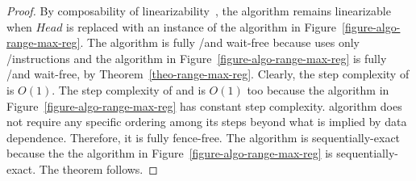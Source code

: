 \begin{proof}
By composability of linearizability~\cite{DBLP_journals_toplas_HerlihyW90}, the algorithm remains linearizable when \(Head\) is replaced with an instance of the algorithm in Figure~\ref{figure-algo-range-max-reg}.  The algorithm is fully \R/\W and wait-free because \Put uses only \R/\W instructions and the \RangeMaxReg algorithm in Figure~\ref{figure-algo-range-max-reg} is fully \R/\W and wait-free, by Theorem~\ref{theo-range-max-reg}.  Clearly, the step complexity of \Put is $O(1)$.  The step complexity of \Take and \Steal is $O(1)$ too because the \RangeMaxReg algorithm in Figure~\ref{figure-algo-range-max-reg} has constant step complexity.   algorithm does not require any specific ordering among its steps beyond what is implied by data dependence. Therefore, it is fully fence-free.  The algorithm is sequentially-exact because the the algorithm in Figure~\ref{figure-algo-range-max-reg} is sequentially-exact.  The theorem follows.
\end{proof}

